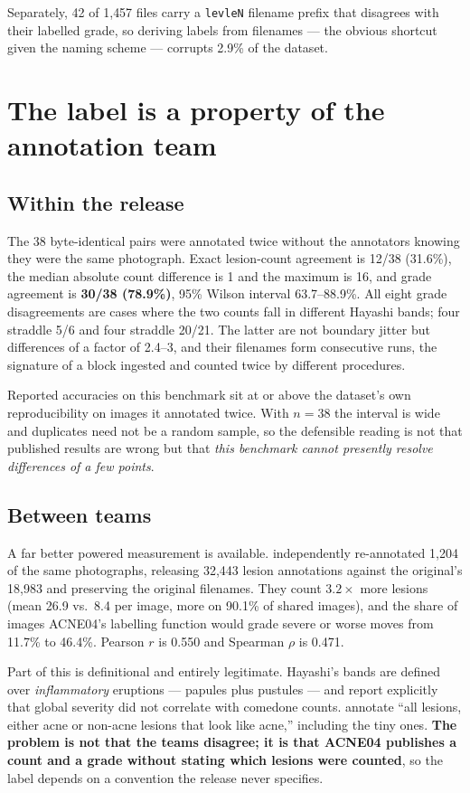 \documentclass[11pt]{article}
\begin{document}
Separately, 42 of 1{,}457 files carry a \texttt{levleN} filename prefix that disagrees
with their labelled grade, so deriving labels from filenames --- the obvious shortcut
given the naming scheme --- corrupts 2.9\% of the dataset.

\section{The label is a property of the annotation team}

\subsection{Within the release}
The 38 byte-identical pairs were annotated twice without the annotators knowing they
were the same photograph. Exact lesion-count agreement is 12/38 (31.6\%), the median
absolute count difference is 1 and the maximum is 16, and grade agreement is
\textbf{30/38 (78.9\%)}, 95\% Wilson interval 63.7--88.9\%. All eight grade
disagreements are cases where the two counts fall in different Hayashi bands; four
straddle 5/6 and four straddle 20/21. The latter are not boundary jitter but differences
of a factor of 2.4--3, and their filenames form consecutive runs, the signature of a
block ingested and counted twice by different procedures.

Reported accuracies on this benchmark sit at or above the dataset's own reproducibility
on images it annotated twice. With $n = 38$ the interval is wide and duplicates need not
be a random sample, so the defensible reading is not that published results are wrong
but that \emph{this benchmark cannot presently resolve differences of a few points}.

\subsection{Between teams}
A far better powered measurement is available. \citet{acneai2024} independently
re-annotated 1{,}204 of the same photographs, releasing 32{,}443 lesion annotations
against the original's 18{,}983 and preserving the original filenames. They count
$3.2\times$ more lesions (mean 26.9 vs.\ 8.4 per image, more on 90.1\% of shared
images), and the share of images ACNE04's labelling function would grade severe or worse
moves from 11.7\% to 46.4\%. Pearson $r$ is 0.550 and Spearman $\rho$ is 0.471.

Part of this is definitional and entirely legitimate. Hayashi's bands are defined over
\emph{inflammatory} eruptions --- papules plus pustules --- and \citet{hayashi2008}
report explicitly that global severity did not correlate with comedone counts.
\citet{acneai2024} annotate ``all lesions, either acne or non-acne lesions that look like
acne,'' including the tiny ones. \textbf{The problem is not that the teams disagree; it
is that ACNE04 publishes a count and a grade without stating which lesions were counted},
so the label depends on a convention the release never specifies.
\end{document}
